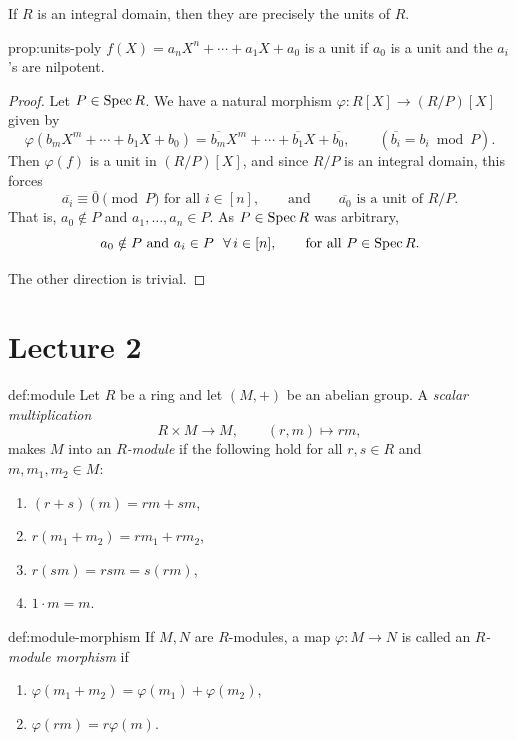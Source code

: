If $R$ is an integral domain, then they are precisely the units of $R$.

\begin{proposition}{}{prop:units-poly}
$f(X) = a_n X^n + \cdots + a_1 X + a_0$ is a unit if $a_0$ is a unit and the $a_i$'s are nilpotent.
\end{proposition}

\begin{proof}
Let $P \in \operatorname{Spec} R$. We have a natural morphism $\varphi: R[X] \to (R/P)[X]$ given by
\[
\varphi(b_m X^m + \cdots + b_1 X + b_0) = \overline{b_m} X^m + \cdots + \overline{b_1} X + \overline{b_0}, \qquad (\overline{b_i} = b_i \bmod P).
\]
Then $\varphi(f)$ is a unit in $(R/P)[X]$, and since $R/P$ is an integral domain, this forces
\[
\overline{a_i} \equiv \overline{0} \pmod{P} \text{ for all } i \in [n], \qquad \text{and} \qquad \overline{a_0} \text{ is a unit of } R/P.
\]
That is, $a_0 \notin P$ and $a_1, \ldots, a_n \in P$. As $P \in \operatorname{Spec} R$ was arbitrary,
\[
a_0 \notin P \text{ and } a_i \in P \ \ \forall\, i \in [n], \qquad \text{for all } P \in \operatorname{Spec} R.
\]

The other direction is trivial.
\end{proof}

\section{Lecture 2}

\begin{definition}{}{def:module}
Let $R$ be a ring and let $(M, +)$ be an abelian group. A \emph{scalar multiplication}
\[
R \times M \longrightarrow M, \qquad (r, m) \longmapsto rm,
\]
makes $M$ into an \emph{$R$-module} if the following hold for all $r, s \in R$ and $m, m_1, m_2 \in M$:
\begin{enumerate}[label=(\roman*)]
    \item $(r + s)(m) = rm + sm$,
    \item $r(m_1 + m_2) = rm_1 + rm_2$,
    \item $r(sm) = rsm = s(rm)$,
    \item $1 \cdot m = m$.
\end{enumerate}
\end{definition}

\begin{definition}{}{def:module-morphism}
If $M, N$ are $R$-modules, a map $\varphi: M \to N$ is called an \emph{$R$-module morphism} if
\begin{enumerate}[label=(\roman*)]
    \item $\varphi(m_1 + m_2) = \varphi(m_1) + \varphi(m_2)$,
    \item $\varphi(rm) = r\varphi(m)$.
\end{enumerate}
\end{definition}

